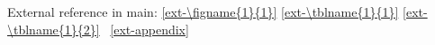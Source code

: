 \documentclass[12pt, lettersize]{article}
\begin{document}

\newpage



\newpage







External reference in main:
\ref{ext-\figname{1}{1}}
\ref{ext-\tblname{1}{1}}
\ref{ext-\tblname{1}{2}}
\APPENDIX~\ref{ext-appendix}

\newpage
\printbibliography


\newpage
\appendix


\end{document}
